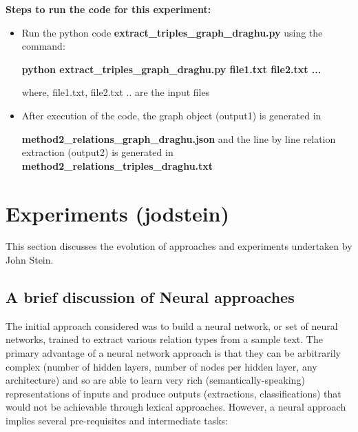 \documentclass[11pt,letterpaper]{article}
\begin{document}
\noindent \newline
\textbf{Steps to run the code for this experiment:}
\begin{itemize}
    \item Run the python code \textbf{extract\_triples\_graph\_draghu.py} using the command:
    
    \textbf{python extract\_triples\_graph\_draghu.py file1.txt file2.txt ...}
    
    where, file1.txt, file2.txt .. are the input files
    
    \item After execution of the code, the graph object (output1) is generated in
    
    \textbf{method2\_relations\_graph\_draghu.json} and the line by line relation extraction (output2) is generated in \textbf{method2\_relations\_triples\_draghu.txt}
\end{itemize}
\newpage

\section{Experiments (jodstein)}\label{jodstein_experiments}

This section discusses the evolution of approaches and experiments undertaken by John Stein.

\subsection{A brief discussion of Neural approaches}
The initial approach considered was to build a neural network, or set of neural networks, trained to extract various relation types from a sample text.  The primary advantage of a neural network approach is that they can be arbitrarily complex (number of hidden layers, number of nodes per hidden layer, any architecture) and so are able to learn very rich (semantically-speaking) representations of inputs and produce outputs (extractions, classifications) that would not be achievable through lexical approaches.  However, a neural approach implies several pre-requisites and intermediate tasks:
\end{document}
